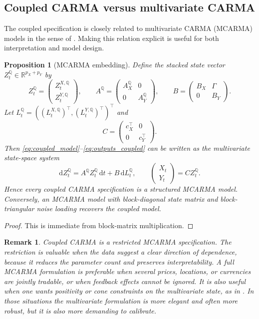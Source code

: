 \documentclass[10pt,a4paper,reqno]{amsart}
\newtheorem{proposition}[theorem]{Proposition}
\newtheorem{remark}[theorem]{Remark}
\newcommand{\R}{\mathbb{R}}
\newcommand{\Q}{\mathbb{Q}}
\newcommand{\1}{\mathbbm{1}}
\newcommand{\dd}{\mathrm{d}}
\begin{document}
\subsection{Coupled CARMA versus multivariate CARMA}

The coupled specification is closely related to multivariate CARMA (MCARMA)
models in the sense of \citet{Mar07}. Making this relation explicit is useful
for both interpretation and model design.

\begin{proposition}[MCARMA embedding]
\label{prop:mcarma_embedding}
Define the stacked state vector $Z_t^\Q \in \R^{p_X+p_Y}$ by
$$
Z_t^\Q
= \begin{pmatrix}
    Z_t^{X,\Q}\\
    Z_t^{Y,\Q}
  \end{pmatrix},
\qquad
A^\Q
= \begin{pmatrix}
    A_X^\Q & 0\\
    0 & A_Y^\Q
  \end{pmatrix},
\qquad
B
= \begin{pmatrix}
    B_X & \Gamma\\
    0 & B_Y
  \end{pmatrix}.
$$
Let $L_t^\Q = ((L_t^{X,\Q})^\top,(L_t^{Y,\Q})^\top)^\top$ and
$$
C
= \begin{pmatrix}
    c_X^\top & 0\\
    0 & c_Y^\top
  \end{pmatrix}.
$$
Then \eqref{eq:coupled_model}--\eqref{eq:outputs_coupled} can be written as the
multivariate state-space system
$$
\dd Z_t^\Q = A^\Q Z_t^\Q\,\dd t + B\,\dd L_t^\Q,
\qquad
\begin{pmatrix}
  X_t\\
  Y_t
\end{pmatrix}
= C Z_t^\Q.
$$
Hence every coupled CARMA specification is a structured MCARMA model. Conversely,
an MCARMA model with block-diagonal state matrix and block-triangular noise
loading recovers the coupled model.
\end{proposition}

\begin{proof}
This is immediate from block-matrix multiplication.
\end{proof}

\begin{remark}
Coupled CARMA is a restricted MCARMA specification. The restriction is valuable
when the data suggest a clear
direction of dependence, because it reduces the parameter count and preserves
interpretability. A full MCARMA formulation is preferable when several prices,
locations, or currencies are jointly tradable, or when feedback effects cannot
be ignored. It is also useful when one wants positivity or cone constraints on
the multivariate state, as in \citet{Ben23}. In those situations the
multivariate formulation is more elegant and often more robust, but it is also
more demanding to calibrate.
\end{remark}
\end{document}
